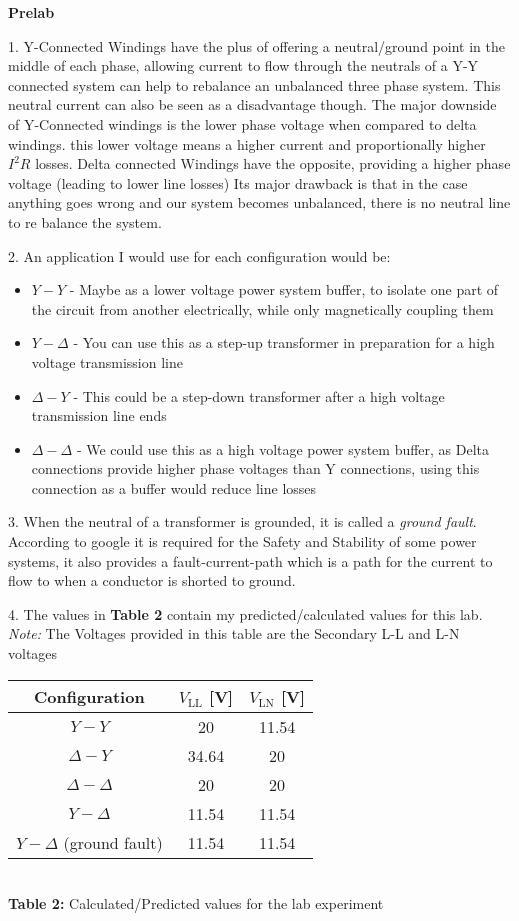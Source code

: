 \documentclass[]{report}
\begin{document}
\textbf{Prelab}

1. Y-Connected Windings have the plus of offering a neutral/ground point in the middle of each phase, allowing current to flow through the neutrals of a Y-Y connected system can help to rebalance an unbalanced three phase system. This neutral current can also be seen as a disadvantage though. The major downside of Y-Connected windings is the lower phase voltage when compared to delta windings. this lower voltage means a higher current and proportionally higher $I^2 R$ losses.
Delta connected Windings have the opposite, providing a higher phase voltage (leading to lower line losses) Its major drawback is that in the case anything goes wrong and our system becomes unbalanced, there is no neutral line to re balance the system.

2. An application I would use for each configuration would be:
\begin{itemize}
	\item $Y-Y$  - Maybe as a lower voltage power system buffer, to isolate one part of the circuit from another electrically, while only magnetically coupling them
	\item $Y-\Delta$ - You can use this as a step-up transformer in preparation for a high voltage transmission line
	\item $\Delta-Y$ - This could be a step-down transformer after a high voltage transmission line ends
	\item $\Delta-\Delta$ - We could use this as a high voltage power system buffer, as Delta connections provide higher phase voltages than Y connections, using this connection as a buffer would reduce line losses
\end{itemize}

3. When the neutral of a transformer is grounded, it is called a \textit{ground fault}. According to google it is required for the Safety and Stability of some power systems, it also provides a fault-current-path which is a path for the current to flow to when a conductor is shorted to ground. 

4. The values in \textbf{Table 2} contain my predicted/calculated values for this lab. \textit{Note:} The Voltages provided in this table are the Secondary L-L and L-N voltages

\begin{table}[h]
	\centering
		\begin{tabular}{@{}c|cc@{}}
		Configuration          			& $V_\text{LL}$ [V]	& $V_\text{LN}$ [V]		\\ \midrule
		$Y-Y $                   		&  20  		&   11.54 		\\
		$\Delta-Y$                  	&  34.64 	&   20 		\\
		$\Delta-\Delta$             	&  20 		&   20		\\
		$Y-\Delta$                  	&  11.54  	&   11.54 		\\
		$Y-\Delta$ (ground fault) 		&  11.54  	&   11.54 		\\
	\end{tabular} \\ \vspace{1em}
	\textbf{Table 2:} Calculated/Predicted values for the lab experiment
\end{table}
\end{document}
